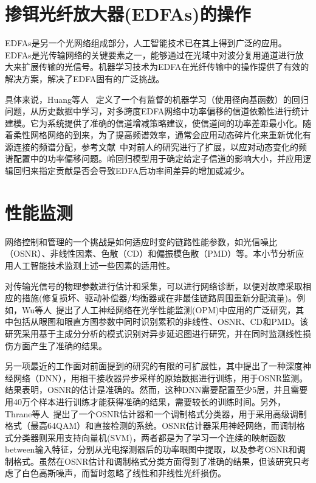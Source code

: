 \documentclass[degree=project,degree-type=project,cjk-font=noto]{thuthesis}
\begin{document}
\section{掺铒光纤放大器(EDFAs)的操作}

EDFAs是另一个光网络组成部分，人工智能技术已在其上得到广泛的应用。EDFAs是光传输网络的关键要素之一，能够通过在光域中对波分复用通道进行放大来扩展传输的光信号。机器学习技术为EDFA在光纤传输中的操作提供了有效的解决方案，解决了EDFA固有的广泛挑战。

具体来说，Huang等人~\cite{EDFA1} 定义了一个有监督的机器学习（使用径向基函数）的回归问题，从历史数据中学习，对多跨度EDFA网络中功率偏移的信道依赖性进行统计建模。它为系统提供了准确的信道增减策略建议，使信道间的功率差距最小化。随着柔性网格网络的到来，为了提高频谱效率，通常会应用动态碎片化来重新优化有源连接的频谱分配，参考文献~\cite{EDFA2}中对前人的研究进行了扩展，以应对动态变化的频谱配置中的功率偏移问题。岭回归模型用于确定给定子信道的影响大小，并应用逻辑回归来指定贡献是否会导致EDFA后功率间差异的增加或减少。

\section{性能监测}

网络控制和管理的一个挑战是如何适应时变的链路性能参数，如光信噪比（OSNR）、非线性因素、色散（CD）和偏振模色散（PMD）等。本小节分析应用人工智能技术监测上述一些因素的适用性。

对传输光信号的物理参数进行估计和采集，可以进行网络诊断，以便对故障采取相应的措施(修复损坏、驱动补偿器/均衡器或在非最佳链路周围重新分配流量)。例如，Wu等人~\cite{Wu}提出了人工神经网络在光学性能监测(OPM)中应用的广泛研究，其中包括从眼图和眼直方图参数中同时识别累积的非线性、OSNR、CD和PMD。该研究采用基于主成分分析的模式识别对异步延迟图进行研究，并在同时监测线性损伤方面产生了准确的结果。

另一项最近的工作面对前面提到的研究的有限的可扩展性，其中提出了一种深度神经网络（DNN），用相干接收器异步采样的原始数据进行训练，用于OSNR监测。结果表明，OSNR的估计是准确的。然而，这种DNN需要配置至少5层，并且需要用40万个样本进行训练才能获得准确的结果，需要较长的训练时间。另外，Thrane等人~\cite{osnr}提出了一个OSNR估计器和一个调制格式分类器，用于采用高级调制格式（最高64QAM）和直接检测的系统。OSNR估计器采用神经网络，而调制格式分类器则采用支持向量机(SVM)，两者都是为了学习一个连续的映射函数between输入特征，分别从光电探测器后的功率眼图中提取，以及参考OSNR和调制格式。虽然在OSNR估计和调制格式分类方面得到了准确的结果，但该研究只考虑了白色高斯噪声，而暂时忽略了线性和非线性光纤损伤。

\backmatter


\appendix
\end{document}
